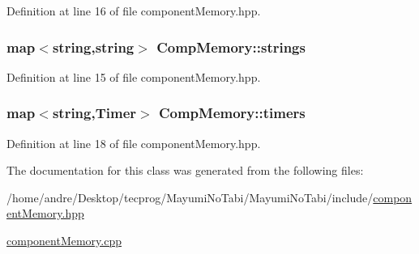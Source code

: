 Definition at line 16 of file component\-Memory.\-hpp.

\hypertarget{class_comp_memory_aa2a6de6504cff7ef8cf152fd85639322}{
\subsubsection[{strings}]{\setlength{\rightskip}{0pt plus 5cm}map$<${\bf string},{\bf string}$>$ Comp\-Memory\-::strings}}\label{class_comp_memory_aa2a6de6504cff7ef8cf152fd85639322}


Definition at line 15 of file component\-Memory.\-hpp.

\hypertarget{class_comp_memory_a39c595db31aa1fe1785ec2a4e9b65eec}{
\subsubsection[{timers}]{\setlength{\rightskip}{0pt plus 5cm}map$<${\bf string},{\bf Timer}$>$ Comp\-Memory\-::timers}}\label{class_comp_memory_a39c595db31aa1fe1785ec2a4e9b65eec}


Definition at line 18 of file component\-Memory.\-hpp.



The documentation for this class was generated from the following files\-:\begin{DoxyCompactItemize}
\item 
/home/andre/\-Desktop/tecprog/\-Mayumi\-No\-Tabi/\-Mayumi\-No\-Tabi/include/\hyperlink{component_memory_8hpp}{component\-Memory.\-hpp}\item 
\hyperlink{component_memory_8cpp}{component\-Memory.\-cpp}\end{DoxyCompactItemize}
